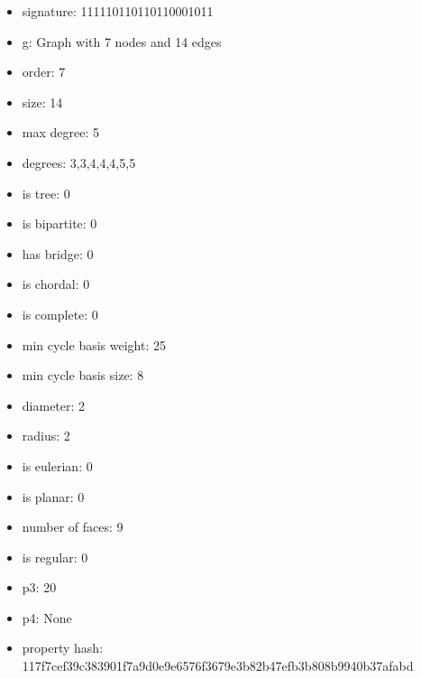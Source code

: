 \begin{itemize}
\item signature: 111110110110110001011
\item g: Graph with 7 nodes and 14 edges
\item order: 7
\item size: 14
\item max degree: 5
\item degrees: 3,3,4,4,4,5,5
\item is tree: 0
\item is bipartite: 0
\item has bridge: 0
\item is chordal: 0
\item is complete: 0
\item min cycle basis weight: 25
\item min cycle basis size: 8
\item diameter: 2
\item radius: 2
\item is eulerian: 0
\item is planar: 0
\item number of faces: 9
\item is regular: 0
\item p3: 20
\item p4: None
\item property hash: 117f7cef39c383901f7a9d0e9e6576f3679e3b82b47efb3b808b9940b37afabd
\end{itemize}
\newpage
\begin{figure}
\end{figure}
